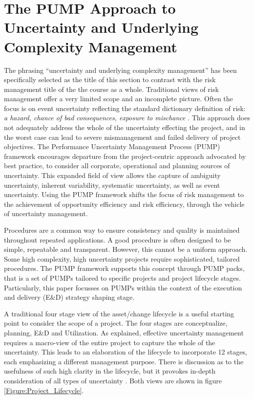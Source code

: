 
\section{The PUMP Approach to Uncertainty and Underlying Complexity Management}


The phrasing ``uncertainty and underlying complexity management'' has been specifically selected as the title of this section to contrast with the risk management title of the the course as a whole.
Traditional views of risk management offer a very limited scope and an incomplete picture.
Often the focus is on event uncertainty reflecting the standard dictionary definition of risk: \textit{a hazard, chance of bad consequences, exposure to mischance} \citep{OED}.
This approach does not adequately address the whole of the uncertainty effecting the project, and in the worst case can lead to severe mismanagement and failed delivery of project objectives.
The Performance Uncertainty Management Process (PUMP) framework encourages departure from the project-centric approach advocated by best practice, to consider all corporate, operational and planning sources of uncertainty.
This expanded field of view allows the capture of ambiguity uncertainty, inherent variability, systematic uncertainty, as well as event uncertainty.
Using the PUMP framework shifts the focus of risk management to the achievement of opportunity efficiency and risk efficiency, through the vehicle of uncertainty management.

Procedures are a common way to ensure consistency and quality is maintained throughout repeated applications.
A good procedure is often designed to be simple, repeatable and transparent.
However, this cannot be a uniform approach.
Some high complexity, high uncertainty projects require sophisticated, tailored procedures.
The PUMP framework supports this concept through PUMP packs, that is a set of PUMPs tailored to specific projects and project lifecycle stages.
Particularly, this paper focusses on PUMPs within the context of the execution and delivery (E\&D) strategy shaping stage.

A traditional four stage view of the asset/change lifecycle is a useful starting point to consider the scope of a project.
The four stages are conceptualize, planning, E\&D and Utilization.
As explained, effective uncertainty management requires a macro-view of the entire project to capture the whole of the uncertainty.
This leads to an elaboration of the lifecycle to incorporate 12 stages, each emphasizing a different management purpose.
There is discussion as to the usefulness of such high clarity in the lifecycle, but it provokes in-depth consideration of all types of uncertainty \citep{Ward1995145}.
Both views are shown in figure \ref{Figure:Project_Lifecycle}.

